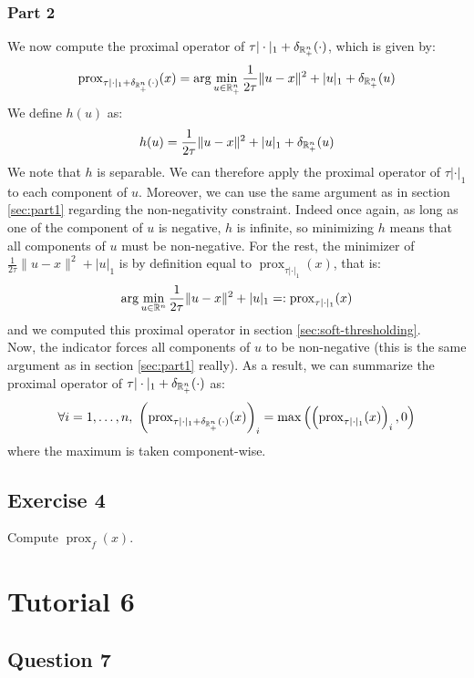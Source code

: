 \documentclass[12pt]{article}
\newcommand{\prox}{\operatorname{prox}}
\begin{document}
\subsubsection{Part 2}
We now compute the proximal operator of $\tau |\cdot|_1 + \delta_{\mathbb{R}_+^n} (\cdot)$, which is given by:
\begin{equation*}
  \prox_{\tau |\cdot|_1 + \delta_{\R_+^n} (\cdot)}(x) = \arg\min_{u \in \R_+^n} \frac{1}{2\tau}\|u-x\|^2 + |u|_1 + \delta_{\R_+^n} (u)
\end{equation*}
We define $h(u)$ as:
\begin{equation*}
  h(u) = \frac{1}{2\tau}\|u-x\|^2 + |u|_1 + \delta_{\mathbb{R}_+^n} (u)
\end{equation*}
We note that $h$ is separable. We can therefore apply the proximal operator of $\tau |\cdot|_1$ to each component of $u$. Moreover, we can use the same argument as in section \ref{sec:part1} regarding the non-negativity constraint. Indeed once again, as long as one of the component of $u$ is negative, $h$ is infinite, so minimizing $h$ means that all components of $u$ must be non-negative. For the rest, the minimizer of $\frac{1}{2\tau}\|u-x\|^2 + |u|_1$ is by definition equal to $\prox_{\tau |\cdot|_1}(x)$, that is:
\begin{equation*}
  \arg\min_{u \in \R^n} \frac{1}{2\tau}\|u-x\|^2 + |u|_1 =: \prox_{\tau |\cdot|_1}(x)
\end{equation*}
and we computed this proximal operator in section \ref{sec:soft-thresholding}. \\
Now, the indicator forces all components of $u$ to be non-negative (this is the same argument as in section \ref{sec:part1} really). As a result, we can summarize the proximal operator of $\tau |\cdot|_1 + \delta_{\mathbb{R}_+^n} (\cdot)$ as:
\begin{equation*}
  \forall i = 1, \ldots, n, \  \left(\prox_{\tau |\cdot|_1 + \delta_{\R_+^n} (\cdot)}(x)\right)_i = \max\left(\left(\prox_{\tau |\cdot|_1}(x)\right)_i, 0\right)
\end{equation*}
where the maximum is taken component-wise.



\subsection{Exercise 4}
Compute $\prox_{f}(x)$.


\section{Tutorial 6}
\subsection{Question 7}


\end{document}
